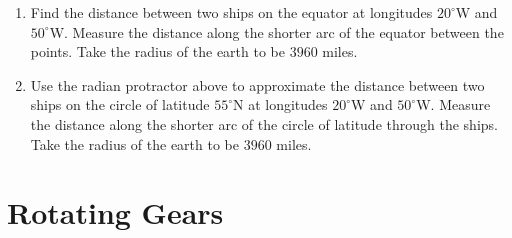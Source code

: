 \documentclass{ximera}
\begin{document}
\begin{question} \label{Q35yt6344bnxx}
\begin{enumerate}
\item Find the distance between two ships on the equator at longitudes $20^\circ$W and $50^\circ$W. Measure the distance along the shorter arc of the equator between the points. Take the radius of the earth to be $3960$ miles.

\item Use the radian protractor above to approximate the distance between two ships on the circle of latitude $55^\circ$N at longitudes $20^\circ$W and $50^\circ$W. Measure the distance along the shorter arc of the circle of latitude through the ships.  Take the radius of the earth to be $3960$ miles.
\end{enumerate}

 
\begin{onlineOnly}
    \begin{center}
\end{center}
\end{onlineOnly}


\end{question}







\section{Rotating Gears}
\end{document}
